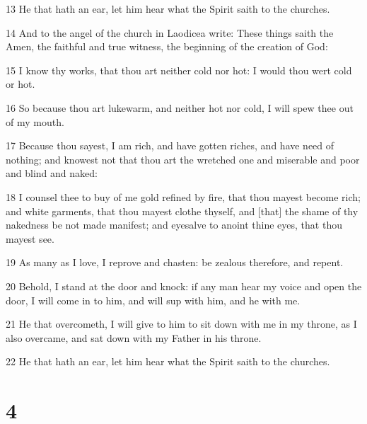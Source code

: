 \par 13 He that hath an ear, let him hear what the Spirit saith to the churches.
\par 14 And to the angel of the church in Laodicea write: These things saith the Amen, the faithful and true witness, the beginning of the creation of God:
\par 15 I know thy works, that thou art neither cold nor hot: I would thou wert cold or hot.
\par 16 So because thou art lukewarm, and neither hot nor cold, I will spew thee out of my mouth.
\par 17 Because thou sayest, I am rich, and have gotten riches, and have need of nothing; and knowest not that thou art the wretched one and miserable and poor and blind and naked:
\par 18 I counsel thee to buy of me gold refined by fire, that thou mayest become rich; and white garments, that thou mayest clothe thyself, and [that] the shame of thy nakedness be not made manifest; and eyesalve to anoint thine eyes, that thou mayest see.
\par 19 As many as I love, I reprove and chasten: be zealous therefore, and repent.
\par 20 Behold, I stand at the door and knock: if any man hear my voice and open the door, I will come in to him, and will sup with him, and he with me.
\par 21 He that overcometh, I will give to him to sit down with me in my throne, as I also overcame, and sat down with my Father in his throne.
\par 22 He that hath an ear, let him hear what the Spirit saith to the churches.

\chapter{4}

